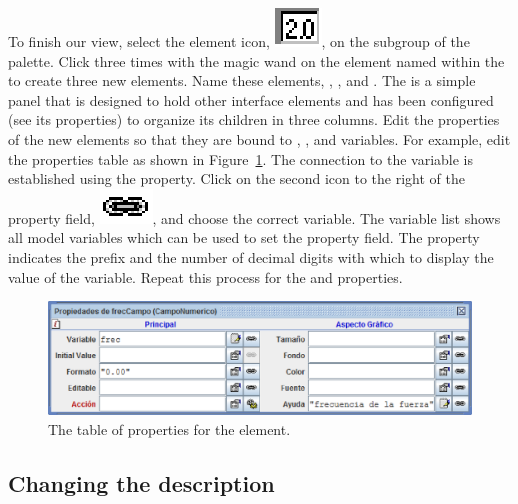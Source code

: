 To finish our view, select the  element icon, \includegraphics[scale=\linescale]{images/Elements/ParsedField.eps}, on the  subgroup of the  palette. Click three times with the magic wand on the element named  within the  to create three new elements. Name these elements, , , and . The  is a simple panel that is designed to hold other interface elements and has been configured (see its properties) to organize its children in three columns. Edit the properties of the new  elements so that they are bound to , , and  variables. For example, edit the  properties table as shown in Figure~\ref{fig:02EjsIntro/ModifyField}. The connection to the  variable is established using the  property.  Click on the second icon to the right of the property field, \includegraphics[scale=\linescale]{images/link.eps}, and choose the correct variable. The variable list shows all model variables which can be used to set the property field. The  property indicates the prefix and the number of decimal digits with which to display the value of the variable. Repeat this process for the  and  properties.

\begin{figure}[htb]
    \centering
  \includegraphics[scale=\scale]{02EjsIntro/images/ModifyField.eps}
    \caption{The table of properties for the  element.}
    \label{fig:02EjsIntro/ModifyField}
\end{figure}

\subsection{Changing the description}\label{section:02ModifyingDescription}

